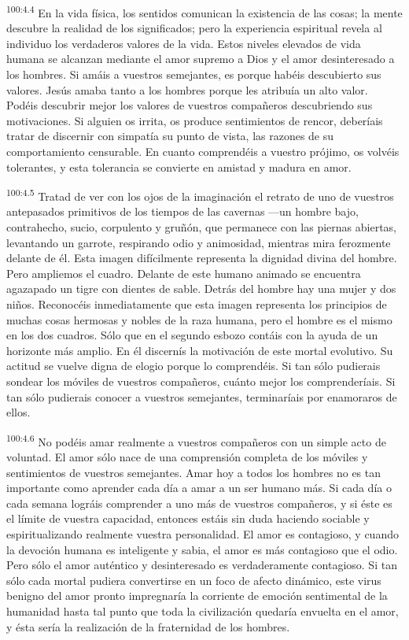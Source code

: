 \documentclass[twoside, 11pt]{book}
\begin{document}
\par
\textsuperscript{100:4.4} En la vida física, los sentidos comunican la existencia de las cosas; la mente descubre la realidad de los significados; pero la experiencia espiritual revela al individuo los verdaderos valores de la vida. Estos niveles elevados de vida humana se alcanzan mediante el amor supremo a Dios y el amor desinteresado a los hombres. Si amáis a vuestros semejantes, es porque habéis descubierto sus valores. Jesús amaba tanto a los hombres porque les atribuía un alto valor. Podéis descubrir mejor los valores de vuestros compañeros descubriendo sus motivaciones. Si alguien os irrita, os produce sentimientos de rencor, deberíais tratar de discernir con simpatía su punto de vista, las razones de su comportamiento censurable. En cuanto comprendéis a vuestro prójimo, os volvéis tolerantes, y esta tolerancia se convierte en amistad y madura en amor.

\par
\textsuperscript{100:4.5} Tratad de ver con los ojos de la imaginación el retrato de uno de vuestros antepasados primitivos de los tiempos de las cavernas ---un hombre bajo, contrahecho, sucio, corpulento y gruñón, que permanece con las piernas abiertas, levantando un garrote, respirando odio y animosidad, mientras mira ferozmente delante de él. Esta imagen difícilmente representa la dignidad divina del hombre. Pero ampliemos el cuadro. Delante de este humano animado se encuentra agazapado un tigre con dientes de sable. Detrás del hombre hay una mujer y dos niños. Reconocéis inmediatamente que esta imagen representa los principios de muchas cosas hermosas y nobles de la raza humana, pero el hombre es el mismo en los dos cuadros. Sólo que en el segundo esbozo contáis con la ayuda de un horizonte más amplio. En él discernís la motivación de este mortal evolutivo. Su actitud se vuelve digna de elogio porque lo comprendéis. Si tan sólo pudierais sondear los móviles de vuestros compañeros, cuánto mejor los comprenderíais. Si tan sólo pudierais conocer a vuestros semejantes, terminaríais por enamoraros de ellos.

\par
\textsuperscript{100:4.6} No podéis amar realmente a vuestros compañeros con un simple acto de voluntad. El amor sólo nace de una comprensión completa de los móviles y sentimientos de vuestros semejantes. Amar hoy a todos los hombres no es tan importante como aprender cada día a amar a un ser humano más. Si cada día o cada semana lográis comprender a uno más de vuestros compañeros, y si éste es el límite de vuestra capacidad, entonces estáis sin duda haciendo sociable y espiritualizando realmente vuestra personalidad. El amor es contagioso, y cuando la devoción humana es inteligente y sabia, el amor es más contagioso que el odio. Pero sólo el amor auténtico y desinteresado es verdaderamente contagioso. Si tan sólo cada mortal pudiera convertirse en un foco de afecto dinámico, este virus benigno del amor pronto impregnaría la corriente de emoción sentimental de la humanidad hasta tal punto que toda la civilización quedaría envuelta en el amor, y ésta sería la realización de la fraternidad de los hombres.
\end{document}
